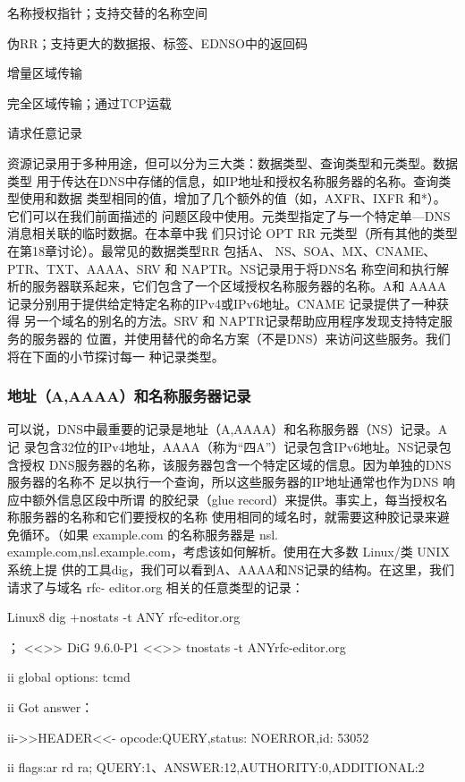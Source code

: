 名称授权指针；支持交替的名称空间

伪RR；支持更大的数据报、标签、EDNSO中的返回码

增量区域传输

完全区域传输；通过TCP运载

请求任意记录

资源记录用于多种用途，但可以分为三大类：数据类型、查询类型和元类型。数据类型
用于传达在DNS中存储的信息，如IP地址和授权名称服务器的名称。查询类型使用和数据
类型相同的值，增加了几个额外的值（如，AXFR、IXFR 和*）。它们可以在我们前面描述的
问题区段中使用。元类型指定了与一个特定单—DNS 消息相关联的临时数据。在本章中我
们只讨论 OPT RR 元类型（所有其他的类型在第18章讨论）。最常见的数据类型RR 包括A、
NS、SOA、MX、CNAME、PTR、TXT、AAAA、SRV 和 NAPTR。NS记录用于将DNS名
称空间和执行解析的服务器联系起来，它们包含了一个区域授权名称服务器的名称。A和
AAAA记录分别用于提供给定特定名称的IPv4或IPv6地址。CNAME 记录提供了一种获得
另一个域名的别名的方法。SRV 和 NAPTR记录帮助应用程序发现支持特定服务的服务器的
位置，并使用替代的命名方案（不是DNS）来访问这些服务。我们将在下面的小节探讨每一
种记录类型。

\subsubsection{地址（A,AAAA）和名称服务器记录}

可以说，DNS中最重要的记录是地址（A,AAAA）和名称服务器（NS）记录。A记
录包含32位的IPv4地址，AAAA（称为“四A”）记录包含IPv6地址。NS记录包含授权
DNS服务器的名称，该服务器包含一个特定区域的信息。因为单独的DNS服务器的名称不
足以执行一个查询，所以这些服务器的IP地址通常也作为DNS 响应中额外信息区段中所谓
的胶纪录（glue record）来提供。事实上，每当授权名称服务器的名称和它们要授权的名称
使用相同的域名时，就需要这种胶记录来避免循环。（如果 example.com 的名称服务器是 nsl.
example.com,nsl.example.com，考虑该如何解析。使用在大多数 Linux/类 UNIX 系统上提
供的工具dig，我们可以看到A、AAAA和NS记录的结构。在这里，我们请求了与域名 rfc-
editor.org 相关的任意类型的记录：

Linux8 dig +nostats -t ANY rfc-editor.org

； <<>> DiG 9.6.0-P1 <<>> tnostats -t ANYrfc-editor.org

ii global options: tcmd

ii Got answer：

ii->>HEADER<<- opcode:QUERY,status: NOERROR,id: 53052

ii flags:ar rd ra; QUERY:1、ANSWER:12,AUTHORITY:0,ADDITIONAL:2

